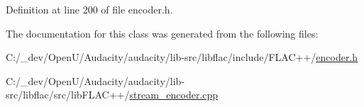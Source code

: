Definition at line 200 of file encoder.\+h.



The documentation for this class was generated from the following files\+:\begin{DoxyCompactItemize}
\item 
C\+:/\+\_\+dev/\+Open\+U/\+Audacity/audacity/lib-\/src/libflac/include/\+F\+L\+A\+C++/\hyperlink{encoder_8h}{encoder.\+h}\item 
C\+:/\+\_\+dev/\+Open\+U/\+Audacity/audacity/lib-\/src/libflac/src/lib\+F\+L\+A\+C++/\hyperlink{stream__encoder_8cpp}{stream\+\_\+encoder.\+cpp}\end{DoxyCompactItemize}
